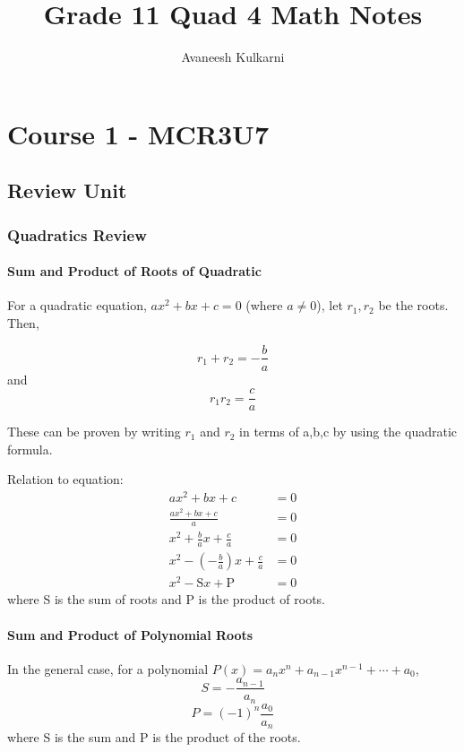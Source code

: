 \documentclass{report}
\title{Grade 11 Quad 4 Math Notes}
\author{Avaneesh Kulkarni}
\date{}
\theoremstyle{definition}
\numberwithin{equation}{section}
\begin{document}
\maketitle
\tableofcontents
\newpage
{}

\chapter{Course 1 - MCR3U7}

\section{Review Unit}

\subsection{Quadratics Review}

\subsubsection*{Sum and Product of Roots of Quadratic}
For a quadratic equation, $ax^2 + bx + c = 0$ (where $a \neq 0$),
let $r_1, r_2$ be the roots. Then,

\begin{equation}\label{sumquad}
	r_1 + r_2 = -\frac{b}{a}
\end{equation}
and
\begin{equation}\label{prodquad}
	r_1 r_2 = \frac{c}{a}
\end{equation}

These can be proven by writing $r_1$ and $r_2$ in terms of a,b,c by using the quadratic formula.

Relation to equation:
\begin{align*}
	ax^2 + bx + c &= 0 \\ 
	\frac{ax^2 + bx + c}{a} &= 0 \\ 
	x^2 + \frac{b}{a}x + \frac{c}{a} &= 0 \\ 
	x^2 - \left( - \frac{b}{a} \right) x + \frac{c}{a} &= 0 \\ 
	x^2 - \mathrm{S} x + \mathrm{P} &= 0 
\end{align*}
where S is the sum of roots and P is the product of roots.

\subsubsection*{Sum and Product of Polynomial Roots}
In the general case, for a polynomial $P(x) = a_nx^n + a_{n-1}x^{n-1} + \dotsb + a_0 $,
\begin{equation}
	S = - \frac{a_{n-1}}{a_n}
\end{equation}
\begin{equation}
	P = (-1)^n \frac{a_0}{a_n}
\end{equation}
where S is the sum and P is the product of the roots.
\end{document}
